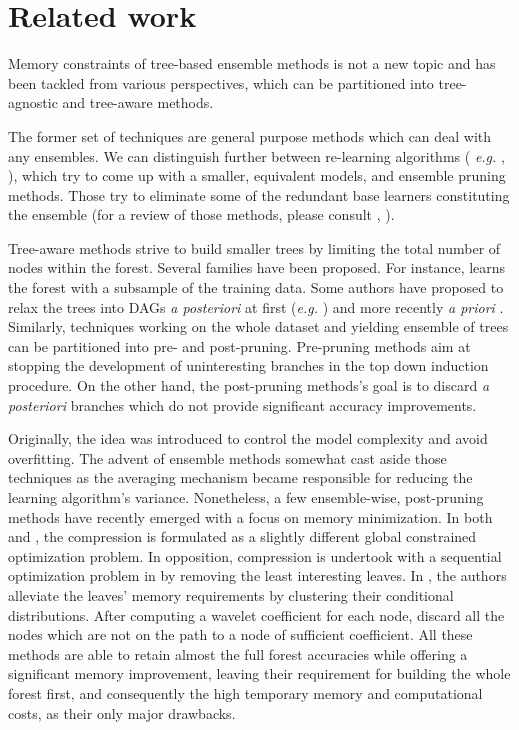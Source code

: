 \documentclass{article}
\begin{document}
\section{Related work}
\label{sec:relatedWork}
Memory constraints of tree-based ensemble methods is not a new topic and has 
been tackled from various perspectives, which can be partitioned into 
tree-agnostic and tree-aware methods.

The former set of techniques are general purpose methods which can deal with  
any ensembles. We can distinguish further between re-learning algorithms ({\it 
e.g.} \cite{domingos1997oracle}, \cite{menke2009oracle}), which try to come 
up with a smaller, equivalent models, and ensemble pruning methods. Those try 
to eliminate some of the redundant base learners constituting the ensemble (for 
a review of those methods, please consult \cite{tsoumakas2008enspruning}, 
\cite{rokach2016enspruning}). 

Tree-aware methods strive to build smaller trees by limiting the total number 
of nodes within the forest. Several families have been proposed. For instance, 
\citet{breiman1999pasting} learns the forest with a subsample of the training 
data. Some authors have proposed to relax the trees into DAGs {\it a 
posteriori} at first ({\it e.g.} \cite{peterson2009dag}) and more recently {\it 
a priori} \cite{shotton2013jungle}. 
Similarly, techniques working on the whole dataset and yielding ensemble of 
trees can be partitioned into pre- and post-pruning. Pre-pruning methods aim at 
stopping the development of uninteresting branches in the top down induction 
procedure. On the other hand, the post-pruning methods's goal is to discard 
{\it a posteriori} branches which do not provide significant accuracy 
improvements.

Originally, the idea was introduced to control the model complexity and avoid 
overfitting. The advent of ensemble methods somewhat cast aside those 
techniques as the averaging mechanism became responsible for reducing the 
learning algorithm's variance. Nonetheless, a few ensemble-wise, post-pruning 
methods have recently emerged with a focus on memory minimization. In both 
\cite{meinshausen2009forestgarrote} and \cite{l1basedcomp}, the compression 
is formulated as a slightly different global constrained optimization problem. 
In opposition, compression is undertook with a sequential optimization problem 
in \cite{ren2015glorefinement} by removing the least interesting leaves.
In \citet{vleeschouwer2015mitimemreq}, the authors alleviate the leaves' memory 
requirements by clustering their conditional distributions. After computing a 
wavelet coefficient for each node, \cite{elisha2016wavelet} discard all the 
nodes which are not on the path to a node of sufficient coefficient.
All these methods are able to retain almost the full forest accuracies while 
offering a significant memory improvement, leaving their requirement for 
building the whole forest first, and consequently the high temporary memory and 
computational costs, as their only major drawbacks.
\end{document}

